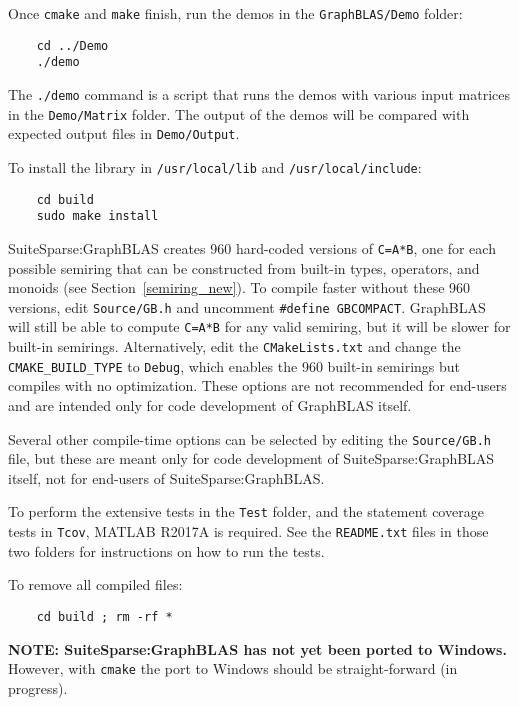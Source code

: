\documentclass[12pt]{article}
\begin{document}
Once \verb'cmake' and \verb'make' finish, run the demos in the
\verb'GraphBLAS/Demo' folder:

    {\small
    \begin{verbatim}
    cd ../Demo
    ./demo \end{verbatim} }

The \verb'./demo' command is a script that runs the demos with various input
matrices in the \verb'Demo/Matrix' folder.  The output of the demos will be
compared with expected output files in \verb'Demo/Output'.

To install the library in \verb'/usr/local/lib' and \verb'/usr/local/include':

    {\small
    \begin{verbatim}
    cd build
    sudo make install \end{verbatim} }

SuiteSparse:GraphBLAS creates 960 hard-coded versions of \verb'C=A*B', one for
each possible semiring that can be constructed from built-in types, operators,
and monoids (see Section~\ref{semiring_new}).  To compile faster without these
960 versions, edit \verb'Source/GB.h' and uncomment \verb'#define GBCOMPACT'.
GraphBLAS will still be able to compute \verb'C=A*B' for any valid semiring,
but it will be slower for built-in semirings.  Alternatively, edit the
\verb'CMakeLists.txt' and change the \verb'CMAKE_BUILD_TYPE' to \verb'Debug',
which enables the 960 built-in semirings but compiles with no optimization.
These options are not recommended for end-users and are intended only for code
development of GraphBLAS itself.

Several other compile-time options can be selected by editing the
\verb'Source/GB.h' file, but these are meant only for code development of
SuiteSparse:GraphBLAS itself, not for end-users of SuiteSparse:GraphBLAS.

To perform the extensive tests in the \verb'Test' folder, and the statement
coverage tests in \verb'Tcov', MATLAB R2017A is required.  See the
\verb'README.txt' files in those two folders for instructions on how to run the
tests.

To remove all compiled files:

    {\small
    \begin{verbatim}
    cd build ; rm -rf * \end{verbatim} }

{\bf NOTE: SuiteSparse:GraphBLAS has not yet been ported to Windows.}
However, with \verb'cmake' the port to Windows should be straight-forward
(in progress).

\newpage
{\small
{}


}
\end{document}

